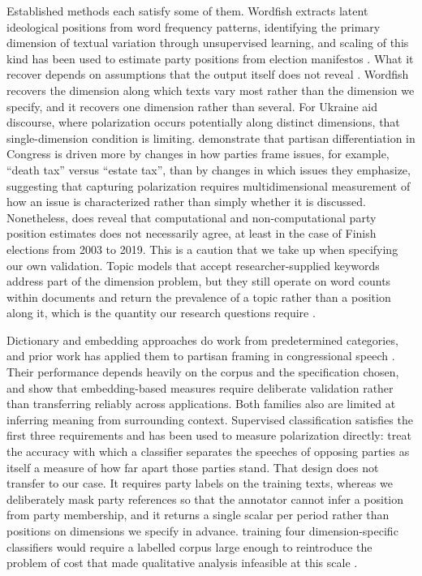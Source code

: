 Established methods each satisfy some of them. Wordfish \citep{slapinScalingModelEstimating2008} extracts latent ideological positions from word frequency patterns, identifying the primary dimension of textual variation through unsupervised learning, and scaling of this kind has been used to estimate party positions from election manifestos \citep{backlundSwedenDemocratsPolitical2011}. What it recover depends on assumptions that the output itself does not reveal \citep{egerodScalingPoliticalPositions2020}. Wordfish recovers the dimension along which texts vary most rather than the dimension we specify, and it recovers one dimension rather than several. For Ukraine aid discourse, where polarization occurs potentially along distinct dimensions, that single-dimension condition is limiting. \citet{gentzkowMeasuringGroupDifferences2019a} demonstrate that partisan differentiation in Congress is driven more by changes in how parties frame issues, for example, ``death tax'' versus ``estate tax'', than by changes in which issues they emphasize, suggesting that capturing polarization requires multidimensional measurement of how an issue is characterized rather than simply whether it is discussed. Nonetheless, \citet{koljonenComparingComputationalNoncomputational2022} does reveal that computational and non-computational party position estimates does not necessarily agree, at least in the case of Finish elections from 2003 to 2019. This is a caution that we take up when specifying our own validation. Topic models that accept researcher-supplied keywords address part of the dimension problem, but they still operate on word counts within documents and return the prevalence of a topic rather than a position along it, which is the quantity our research questions require \citep{eshimaKeywordAssistedTopicModels2024}.

Dictionary and embedding approaches do work from predetermined categories, and prior work has applied them to partisan framing in congressional speech \citep{vanmatreNaturalLanguageProcessing2025}. Their performance depends heavily on the corpus and the specification chosen, and \citet{rodriguezWordEmbeddingsWhat2022} show that embedding-based measures require deliberate validation rather than transferring reliably across applications. Both families also are limited at inferring meaning from surrounding context. Supervised classification satisfies the first three requirements and has been used to measure polarization directly: \citet{petersonClassificationAccuracySubstantive2018} treat the accuracy with which a classifier separates the speeches of opposing parties as itself a measure of how far apart those parties stand. That design does not transfer to our case. It requires party labels on the training texts, whereas we deliberately mask party references so that the annotator cannot infer a position from party membership, and it returns a single scalar per period rather than positions on dimensions we specify in advance. training four dimension-specific classifiers would require a labelled corpus large enough to reintroduce the problem of cost that made qualitative analysis infeasible at this scale \citep{ornsteinHowTrainYour2025,wilkersonLargeScaleComputerizedText2017}.

